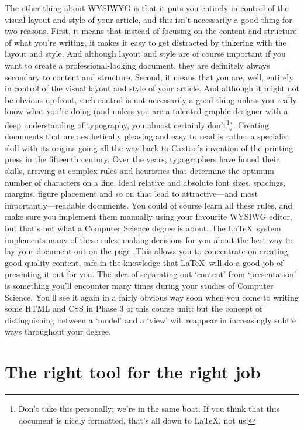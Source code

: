 \begin{refsection}
The other thing about WYSIWYG is that it puts you entirely in control of the visual layout and style of your article, and this isn't necessarily a good thing for two reasons. First, it means that instead of focusing on the content and structure of what you're writing, it makes it easy to get distracted by tinkering with the layout and style. And although layout and style are of course important if you want to create a professional-looking document, they are definitely always secondary to content and structure. Second, it means that you are, well, entirely in control of the visual layout and style of your article. And although it might not be obvious up-front, such control is not necessarily a good thing unless you really know what you're doing (and unless you are a talented graphic designer with a deep understanding of typography, you almost certainly don't\footnote{Don't take this personally; we're in the same boat. If you think that this document is nicely formatted, that's all down to \LaTeX, not us!}). Creating documents that are aesthetically pleasing and easy to read is rather a specialist skill with its origins going all the way back to Caxton's invention of the printing press in the fifteenth century.  Over the years, typographers have honed their skills, arriving at complex rules and heuristics that determine the optimum number of characters on a line, ideal relative and absolute font sizes, spacings, margins, figure placement and so on that lead to attractive---and most importantly---readable documents. You could of course learn all these rules, and make sure you implement them manually using your favourite WYSIWG editor, but that's not what a Computer Science degree is about. The \LaTeX\ system implements many of these rules, making decisions for you about the best way to lay your document out on the page. This allows you to concentrate on creating good quality content, safe in the knowledge that \LaTeX\ will do a good job of presenting it out for you. The idea of separating out `content' from `presentation' is something you'll encounter many times during your studies of Computer Science. You'll see it again in a fairly obvious way soon when you come to writing some HTML and CSS in Phase 3 of this course unit: but the concept of distinguishing between a `model' and a `view' will reappear in increasingly subtle ways throughout your degree. 

\section{The right tool for the right job}


\end{refsection}
